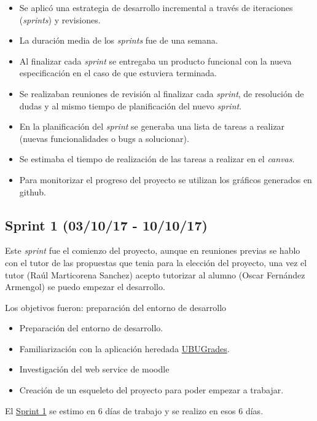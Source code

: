 \begin{itemize}
	\tightlist
	\item
	Se aplicó una estrategia de desarrollo incremental a través de
	iteraciones (\emph{sprints}) y revisiones.
	\item
	La duración media de los \emph{sprints} fue de una semana.
	\item
	Al finalizar cada \emph{sprint} se entregaba un producto funcional con la nueva especificación en el caso de que estuviera terminada.
	\item
	Se realizaban reuniones de revisión al finalizar cada \emph{sprint}, de resolución de dudas y
	al mismo tiempo de planificación del nuevo \emph{sprint}.
	\item
	En la planificación del \emph{sprint} se generaba una lista de tareas a realizar (nuevas funcionalidades o bugs a solucionar).
	\item
	Se estimaba el tiempo de realización de las tareas a realizar en el \emph{canvas}.
	\item
	Para monitorizar el progreso del proyecto se utilizan los gráficos generados en github.
	
\end{itemize}

\subsection{Sprint 1 (03/10/17 -
	10/10/17)}\label{sprint-1-0031017---101017}
Este \emph{sprint} fue el comienzo del proyecto, aunque en reuniones previas se hablo con el tutor de las propuestas que tenia para la elección del proyecto, una vez el tutor (Raúl Marticorena Sanchez) acepto tutorizar al alumno (Oscar Fernández Armengol) se puedo empezar el desarrollo.

Los objetivos fueron: preparación del entorno de desarrollo
\begin{itemize}
	\tightlist
	\item
	Preparación del entorno de desarrollo.
	\item
	Familiarización con la aplicación heredada \href{https://github.com/claumartinezh/TFG_UBUGrades}{UBUGrades}.
	\item
	Investigación del web service de moodle
	\item
	Creación de un esqueleto del proyecto para poder empezar a trabajar.
	
\end{itemize}
El \href{https://github.com/trona85/GII-17.1B-UBULog-1.0/milestone/1?closed=1}{Sprint 1} se estimo en 6 días de trabajo y se realizo en esos 6 días.

